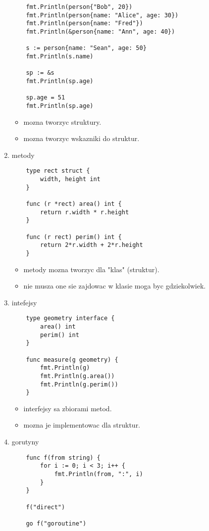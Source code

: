 \documentclass[11pt,a4paper]{article}
\begin{document}
\begin{enumerate}
\begin{verbatim}
    fmt.Println(person{"Bob", 20})
    fmt.Println(person{name: "Alice", age: 30})
    fmt.Println(person{name: "Fred"})
    fmt.Println(&person{name: "Ann", age: 40})

    s := person{name: "Sean", age: 50}
    fmt.Println(s.name)

    sp := &s
    fmt.Println(sp.age)

    sp.age = 51
    fmt.Println(sp.age)
    \end{verbatim}
    \begin{itemize}
        \item mozna tworzyc struktury.
        \item mozna tworzyc wskazniki do struktur.
    \end{itemize}
\item metody \begin{verbatim}
    type rect struct {
        width, height int
    }

    func (r *rect) area() int {
        return r.width * r.height
    }

    func (r rect) perim() int {
        return 2*r.width + 2*r.height
    }
    \end{verbatim}
    \begin{itemize}
        \item metody mozna tworzyc dla "klas" (struktur).
        \item nie musza one sie zajdowac w klasie moga byc gdziekolwiek.
    \end{itemize}
\item intefejsy \begin{verbatim}
    type geometry interface {
        area() int
        perim() int
    }

    func measure(g geometry) {
        fmt.Println(g)
        fmt.Println(g.area())
        fmt.Println(g.perim())
    }
    \end{verbatim}
    \begin{itemize}
        \item interfejsy sa zbiorami metod.
        \item mozna je implementowac dla struktur.
    \end{itemize}
\item gorutyny \begin{verbatim}
    func f(from string) {
        for i := 0; i < 3; i++ {
            fmt.Println(from, ":", i)
        }
    }

    f("direct")

    go f("goroutine")


\end{verbatim}
\end{enumerate}
\end{document}
